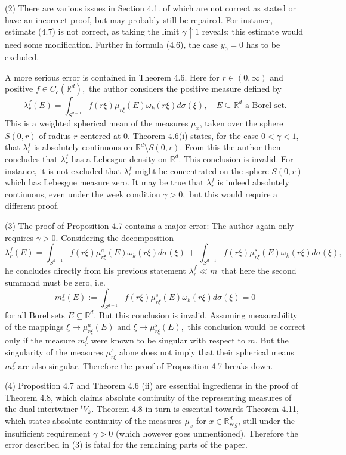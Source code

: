 \documentclass[reqno]{amsart}
\theoremstyle{plain}
\theoremstyle{definition}
\theoremstyle{remark}
\numberwithin{equation}{section}
\begin{document}
 \bigskip\noindent
 (2) There are various issues in Section 4.1. of \cite{T10} which are not correct as stated or have an incorrect proof, but may probably still be repaired.  For instance, estimate (4.7) is not correct, as taking the limit $\gamma\uparrow 1$ reveals; this estimate would need some modification. Further in formula (4.6), the case $y_0=0$ has to be excluded.
 
 A more serious error is contained in Theorem 4.6. Here 
 for $r\in (0,\infty)$ and positive  $f\in C_c(\mathbb R^d),$  the author considers the positive measure defined by
 \begin{equation}\label{lambda_r^f}\lambda_r^f(E) =\int_{S^{d-1}} f(r\xi) \mu_{r\xi}(E)\omega_k(r\xi)d\sigma(\xi), \quad E\subseteq\mathbb R^d \text{ a Borel set.} \end{equation}
 This is a weighted spherical mean of the measures $\mu_x$, taken  over the sphere $S(0,r)$ of radius $r$ centered at $0.$ 
  Theorem 4.6(i) states, for the case $0<\gamma<1$, that $\lambda_r^f$ is absolutely continuous  on $\mathbb R^d\setminus S(0,r)$. From this the author then concludes  that $\lambda_r^f$ has a Lebesgue density on $\mathbb R^d.$ This conclusion is invalid. For instance, it is not excluded that $\lambda_r^f$ might be concentrated on the sphere  $S(0,r)$ which 
 has Lebesgue measure zero.  
 It may be true that $\lambda_r^f$ is indeed absolutely continuous, even under the week condition $\gamma>0,$ but this would require a different proof. 
 
 
 \bigskip\noindent
 (3) The proof of Proposition 4.7 contains a major error: 
 The author again only requires $\gamma>0$. Considering the decomposition 
 $$ \lambda_r^f(E) =\int_{S^{d-1}} f(r\xi) \mu_{r\xi}^a(E)\omega_k(r\xi)d\sigma(\xi)\,+\, \int_{S^{d-1}} f(r\xi) \mu_{r\xi}^s(E)\omega_k(r\xi)d\sigma(\xi),$$
 he concludes directly from his previous statement $\lambda_r^f \ll m\,$ that 
 here the second summand must be zero, i.e. 
 $$ m_r^f(E):= \int_{S^{d-1}} f(r\xi) \mu_{r\xi}^s(E)\omega_k(r\xi)d\sigma(\xi)=0$$ 
 for all  Borel sets $E\subseteq \mathbb R^d.$ But this conclusion is invalid. Assuming measurability of the mappings $\xi\mapsto \mu_{r\xi}^a (E)$ and $\xi\mapsto \mu_{r\xi}^s(E),$ this conclusion would be correct only if the measure $m_r^f$ were known to be singular with respect to $m.$ But the singularity of the measures $\mu_{r\xi}^s$ alone does not imply that their spherical means $m_r^f$ are also singular.
 Therefore the proof of Proposition 4.7 breaks down. 
 
 \medskip\noindent
 (4) 
 Proposition 4.7 and Theorem 4.6 (ii)  are essential ingredients in the proof of Theorem 4.8, which claims absolute continuity of the representing measures of the dual intertwiner $^tV_k.$ Theorem 4.8 in turn is essential towards Theorem 4.11, which states absolute continuity of the measures $\mu_x$ for $x\in \mathbb R^d_{reg}$, still under the insufficient requirement $\gamma>0$ (which however goes unmentioned). Therefore the error described in (3) is fatal for the remaining parts of the paper. 
 
\end{document}
